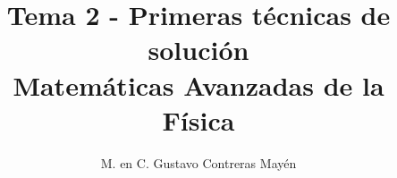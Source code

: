 
\usepackage{standalone}
\usepackage{tikz-3dplot}

\title{Tema 2 - Primeras técnicas de solución \\[0.3em]  \large{Matemáticas Avanzadas de la Física}\vspace{-3ex}}
\author{M. en C. Gustavo Contreras Mayén}
\date{ }

\setlength{\intextsep}{5pt}



\vspace{-4cm}
\maketitle
\fontsize{14}{14}\selectfont
\tableofcontents
\newpage



\setlength{\abovedisplayskip}{4pt}
\setlength{\belowdisplayskip}{4pt}








